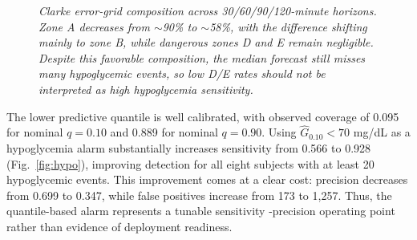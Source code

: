 \documentclass[journal]{IEEEtran}
\begin{document}
\begin{figure}[t]
\centering
{}
\caption{\small\textit{Clarke error-grid composition across 30/60/90/120-minute horizons. Zone A decreases from $\sim$90\% to $\sim$58\%, with the difference shifting mainly to zone B, while dangerous zones D and E remain negligible. Despite this favorable composition, the median forecast still misses many hypoglycemic events, so low D/E rates should not be interpreted as high hypoglycemia sensitivity.}}
\label{fig:clarke}
\end{figure}

The lower predictive quantile is well calibrated, with observed coverage of 0.095 for nominal $q=0.10$ and 0.889 for nominal $q=0.90$. Using $\hat{G}_{0.10}<70$ mg/dL as a hypoglycemia alarm substantially increases sensitivity from 0.566 to 0.928 (Fig.~\ref{fig:hypo}), improving detection for all eight subjects with at least 20 hypoglycemic events. This improvement comes at a clear cost: precision decreases from 0.699 to 0.347, while false positives increase from 173 to 1,257. Thus, the quantile-based alarm represents a tunable sensitivity -precision operating point rather than evidence of deployment readiness.
\end{document}
